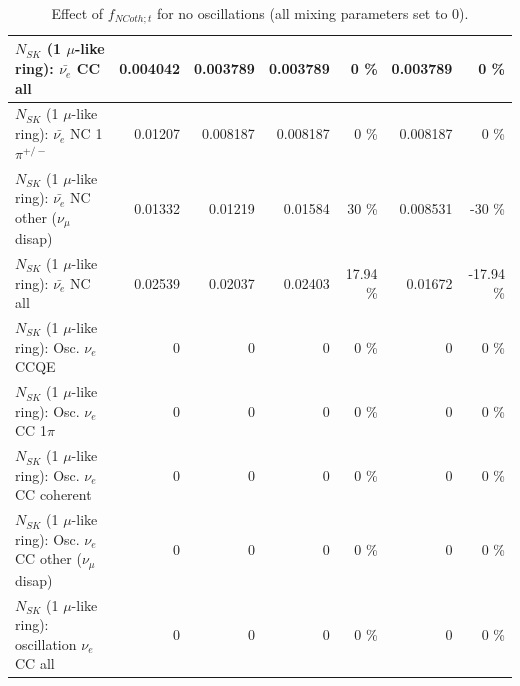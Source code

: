 \begin{table}
\begin{tabular}{| l | r | r | r  r | r  r |}
                            $N_{SK}$ (1 $\mu$-like ring): $\bar{\nu_{e}}$ CC all &        0.004042 &        0.003789 &        0.003789 &        0 \%  &        0.003789 &        0 \%  \\ 
\hline
                     $N_{SK}$ (1 $\mu$-like ring): $\bar{\nu_e}$ NC 1$\pi^{+/-}$ &         0.01207 &        0.008187 &        0.008187 &        0 \%  &        0.008187 &        0 \%  \\ 
          $N_{SK}$ (1 $\mu$-like ring): $\bar{\nu_e}$ NC other ($\nu_\mu$ disap) &         0.01332 &         0.01219 &         0.01584 &       30 \%  &        0.008531 &      -30 \%  \\ 
                            $N_{SK}$ (1 $\mu$-like ring): $\bar{\nu_{e}}$ NC all &         0.02539 &         0.02037 &         0.02403 &    17.94 \%  &         0.01672 &   -17.94 \%  \\ 
\hline
\hline
\hline
                                 $N_{SK}$ (1 $\mu$-like ring): Osc. $\nu_e$ CCQE &               0 &               0 &               0 &        0 \%  &               0 &        0 \%  \\ 
                            $N_{SK}$ (1 $\mu$-like ring): Osc. $\nu_e$ CC 1$\pi$ &               0 &               0 &               0 &        0 \%  &               0 &        0 \%  \\ 
                          $N_{SK}$ (1 $\mu$-like ring): Osc. $\nu_e$ CC coherent &               0 &               0 &               0 &        0 \%  &               0 &        0 \%  \\ 
           $N_{SK}$ (1 $\mu$-like ring): Osc. $\nu_e$ CC other ($\nu_\mu$ disap) &               0 &               0 &               0 &        0 \%  &               0 &        0 \%  \\ 
                        $N_{SK}$ (1 $\mu$-like ring): oscillation $\nu_e$ CC all &               0 &               0 &               0 &        0 \%  &               0 &        0 \%  \\ 
\hline
\hline
\end{tabular}
\caption{ Effect of $f_{NCoth; t}$ for no oscillations (all mixing parameters set to 0). }
\label{tab:num_xsec_norm_ncoth_1RmuT_3f_osc_t13:0}
\end{table}
\clearpage
